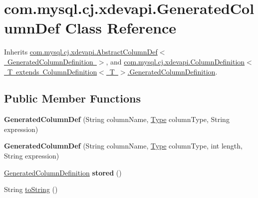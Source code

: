 \hypertarget{classcom_1_1mysql_1_1cj_1_1xdevapi_1_1_generated_column_def}{}\section{com.\+mysql.\+cj.\+xdevapi.\+Generated\+Column\+Def Class Reference}
\label{classcom_1_1mysql_1_1cj_1_1xdevapi_1_1_generated_column_def}


Inherits \mbox{\hyperlink{classcom_1_1mysql_1_1cj_1_1xdevapi_1_1_abstract_column_def}{com.\+mysql.\+cj.\+xdevapi.\+Abstract\+Column\+Def$<$ Generated\+Column\+Definition $>$}}, and \mbox{\hyperlink{interfacecom_1_1mysql_1_1cj_1_1xdevapi_1_1_column_definition_1_1_generated_column_definition}{com.\+mysql.\+cj.\+xdevapi.\+Column\+Definition$<$ T extends Column\+Definition$<$ T $>$.\+Generated\+Column\+Definition}}.

\subsection*{Public Member Functions}
\begin{DoxyCompactItemize}
\item 
\mbox{\label{classcom_1_1mysql_1_1cj_1_1xdevapi_1_1_generated_column_def_a6c25988b13f6cf4248242e47b53a59bc}} 
{\bfseries Generated\+Column\+Def} (String column\+Name, \mbox{\hyperlink{enumcom_1_1mysql_1_1cj_1_1xdevapi_1_1_type}{Type}} column\+Type, String expression)
\item 
\mbox{\label{classcom_1_1mysql_1_1cj_1_1xdevapi_1_1_generated_column_def_adadc19076333f1ce25f7adc836bc059d}} 
{\bfseries Generated\+Column\+Def} (String column\+Name, \mbox{\hyperlink{enumcom_1_1mysql_1_1cj_1_1xdevapi_1_1_type}{Type}} column\+Type, int length, String expression)
\item 
\mbox{\label{classcom_1_1mysql_1_1cj_1_1xdevapi_1_1_generated_column_def_a7518aecc43b11bfa3f23ada2721fd845}} 
\mbox{\hyperlink{interfacecom_1_1mysql_1_1cj_1_1xdevapi_1_1_column_definition_1_1_generated_column_definition}{Generated\+Column\+Definition}} {\bfseries stored} ()
\item 
String \mbox{\hyperlink{classcom_1_1mysql_1_1cj_1_1xdevapi_1_1_generated_column_def_a65933e6c35c706b35df70c6404f88e8a}{to\+String}} ()
\end{DoxyCompactItemize}
